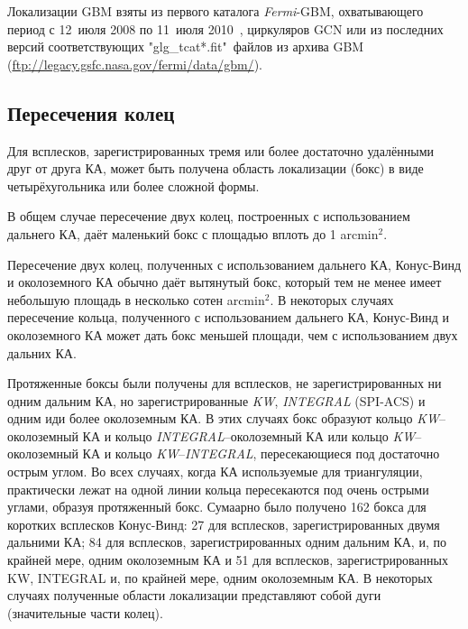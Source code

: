Локализации GBM взяты из первого каталога \textit{Fermi}-GBM, охватывающего период с
12~июля 2008 по 11~июля 2010~\citep{Paciesas_2012ApJS}, циркуляров GCN или из последних 
версий соответствующих "glg\_tcat*.fit"\ файлов из архива GBM 
(\url{ftp://legacy.gsfc.nasa.gov/fermi/data/gbm/}).

\subsection{Пересечения колец}
Для всплесков, зарегистрированных тремя или более достаточно удалёнными друг от 
друга КА, может быть получена область локализации (бокс) в виде четырёхугольника 
или более сложной формы.

В общем случае пересечение двух колец, построенных с использованием дальнего КА,
даёт маленький бокс с площадью вплоть до 1 arcmin$^2$.

Пересечение двух колец, полученных с использованием дальнего КА, Конус-Винд и
околоземного КА обычно даёт вытянутый бокс, который тем не менее имеет небольшую
площадь в несколько сотен arcmin$^2$. В некоторых случаях пересечение кольца, полученного
с использованием дальнего КА, Конус-Винд и околоземного КА может дать бокс меньшей
площади, чем с использованием двух дальних КА.

Протяженные боксы были получены для всплесков, не зарегистрированных ни одним дальним КА, 
но зарегистрированные \textit{KW}, \textit{INTEGRAL} (SPI-ACS) и одним иди более околоземным КА. 
В этих случаях бокс образуют кольцо \textit{KW}--околоземный КА и
кольцо \textit{INTEGRAL}–околоземный КА или кольцо \textit{KW}--околоземный КА 
и кольцо \textit{KW}--\textit{INTEGRAL}, пересекающиеся под достаточно острым углом.
Во всех случаях, когда КА используемые для триангуляции, практически лежат на
одной линии кольца пересекаются под очень острыми углами, образуя протяженный бокс.
Сумаарно было получено 162 бокса для коротких всплесков Конус-Винд: 27 для всплесков, 
зарегистрированных двумя дальними КА; 84 для всплесков, зарегистрированных одним 
дальним КА, и, по крайней мере, одним околоземным КА и 51 для всплесков, 
зарегистрированных KW, INTEGRAL и, по крайней мере, одним околоземным КА. В некоторых
случаях полученные области локализации представляют собой дуги (значительные части
колец).

